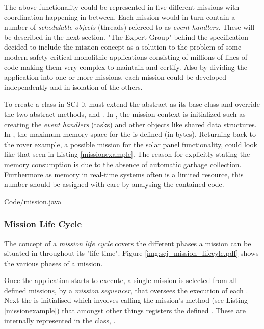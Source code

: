 The above functionality could be represented in five different missions with coordination happening in between. Each mission would in turn contain a number of \textit{schedulable objects} (threads) refereed to as \textit{event handlers}. These will be described in the next section. "The Expert Group" behind the specification decided to include the mission concept as a solution to the problem of some modern safety-critical monolithic applications consisting of millions of lines of code making them very complex to maintain and certify. Also by dividing the application into one or more missions, each mission could be developed independently and in isolation of the others.  

To create a  class in SCJ it must extend the abstract  as its base class and override the two abstract methods,  and . In , the mission context is initialized such as creating the \textit{event handlers} (tasks) and other objects like shared data structures. In , the maximum memory space for the  is defined (in bytes). Returning back to the rover example, a possible mission for the solar panel functionality, could look like that seen in Listing \ref{missionexample}. The reason for explicitly stating the memory consumption is due to the absence of automatic garbage collection. Furthermore as memory in real-time systems often is a limited resource, this number should be assigned with care by analysing the contained code.


{Code/mission.java}

\subsubsection{Mission Life Cycle}
The concept of a \textit{mission life cycle} covers the different phases a mission can be situated in throughout its "life time". Figure \ref{img:scj_mission_lifecyle.pdf} shows the various phases of a mission.


Once the application starts to execute, a single mission is selected from all defined missions, by a \textit{mission sequencer}, that oversees the execution of each . Next the  is initialised which involves calling the mission's  method (see Listing \ref{missionexample}) that amongst other things registers the defined . These are internally represented in the class, . 


